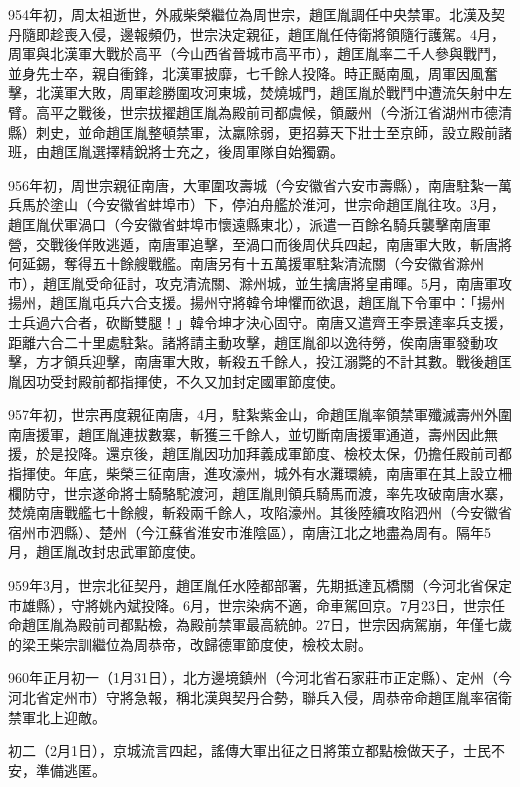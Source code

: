 954年初，周太祖逝世，外戚柴榮繼位為周世宗，趙匡胤調任中央禁軍。北漢及契丹隨即趁喪入侵，邊報頻仍，世宗決定親征，趙匡胤任侍衛將領隨行護駕。4月，周軍與北漢軍大戰於高平（今山西省晉城市高平市），趙匡胤率二千人參與戰鬥，並身先士卒，親自衝鋒，北漢軍披靡，七千餘人投降。時正颳南風，周軍因風奮擊，北漢軍大敗，周軍趁勝圍攻河東城，焚燒城門，趙匡胤於戰鬥中遭流矢射中左臂。高平之戰後，世宗拔擢趙匡胤為殿前司都虞候，領嚴州（今浙江省湖州市德清縣）刺史，並命趙匡胤整頓禁軍，汰羸除弱，更招募天下壯士至京師，設立殿前諸班，由趙匡胤選擇精銳將士充之，後周軍隊自始獨霸。

956年初，周世宗親征南唐，大軍圍攻壽城（今安徽省六安市壽縣），南唐駐紮一萬兵馬於塗山（今安徽省蚌埠市）下，停泊舟艦於淮河，世宗命趙匡胤往攻。3月，趙匡胤伏軍渦口（今安徽省蚌埠市懷遠縣東北），派遣一百餘名騎兵襲擊南唐軍營，交戰後佯敗逃遁，南唐軍追擊，至渦口而後周伏兵四起，南唐軍大敗，斬唐將何延錫，奪得五十餘艘戰艦。南唐另有十五萬援軍駐紮清流關（今安徽省滁州市），趙匡胤受命征討，攻克清流關、滁州城，並生擒唐將皇甫暉。5月，南唐軍攻揚州，趙匡胤屯兵六合支援。揚州守將韓令坤懼而欲退，趙匡胤下令軍中：「揚州士兵過六合者，砍斷雙腿！」韓令坤才決心固守。南唐又遣齊王李景達率兵支援，距離六合二十里處駐紮。諸將請主動攻擊，趙匡胤卻以逸待勞，俟南唐軍發動攻擊，方才領兵迎擊，南唐軍大敗，斬殺五千餘人，投江溺斃的不計其數。戰後趙匡胤因功受封殿前都指揮使，不久又加封定國軍節度使。

957年初，世宗再度親征南唐，4月，駐紮紫金山，命趙匡胤率領禁軍殲滅壽州外圍南唐援軍，趙匡胤連拔數寨，斬獲三千餘人，並切斷南唐援軍通道，壽州因此無援，於是投降。還京後，趙匡胤因功加拜義成軍節度、檢校太保，仍擔任殿前司都指揮使。年底，柴榮三征南唐，進攻濠州，城外有水灘環繞，南唐軍在其上設立柵欄防守，世宗遂命將士騎駱駝渡河，趙匡胤則領兵騎馬而渡，率先攻破南唐水寨，焚燒南唐戰艦七十餘艘，斬殺兩千餘人，攻陷濠州。其後陸續攻陷泗州（今安徽省宿州市泗縣）、楚州（今江蘇省淮安市淮陰區），南唐江北之地盡為周有。隔年5月，趙匡胤改封忠武軍節度使。

959年3月，世宗北征契丹，趙匡胤任水陸都部署，先期抵達瓦橋關（今河北省保定市雄縣），守將姚內斌投降。6月，世宗染病不適，命車駕回京。7月23日，世宗任命趙匡胤為殿前司都點檢，為殿前禁軍最高統帥。27日，世宗因病駕崩，年僅七歲的梁王柴宗訓繼位為周恭帝，改歸德軍節度使，檢校太尉。

960年正月初一（1月31日），北方邊境鎮州（今河北省石家莊市正定縣）、定州（今河北省定州市）守將急報，稱北漢與契丹合勢，聯兵入侵，周恭帝命趙匡胤率宿衛禁軍北上迎敵。

初二（2月1日），京城流言四起，謠傳大軍出征之日將策立都點檢做天子，士民不安，準備逃匿。

